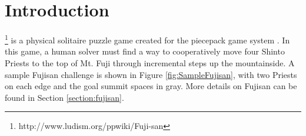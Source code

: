 \documentclass[10pt,journal,compsoc]{IEEEtran}
\begin{document}
%
\IEEEpeerreviewmaketitle


\ifCLASSOPTIONcompsoc
{}
\else
\section{Introduction}
\label{sec:introduction}
\fi




% 
% 
% 
% 
\footnote{http://www.ludism.org/ppwiki/Fuji-san} is a physical solitaire puzzle game created for the piecepack game system \cite{GAMESYSTEM}. In this game, a human solver must find a way to cooperatively move four Shinto Priests to the top of Mt. Fuji through incremental steps up the mountainside. A sample Fujisan challenge is shown in Figure \ref{fig:SampleFujisan}, with two Priests on each edge and the goal summit spaces in gray. More details on Fujisan can be found in Section \ref{section:fujisan}.
\end{document}
